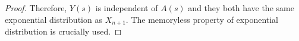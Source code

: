 \documentclass[a4paper,10pt,english]{article}
\begin{document}
\begin{proof}
{}
Therefore,  $Y(s)$ is independent of $A(s)$ and they both have the same exponential distribution as $X_{n+1}$. 
The memoryless property of exponential distribution is crucially used. 
\end{proof}


\appendix 
\end{document}
